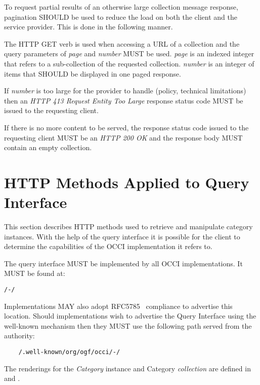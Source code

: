 \documentclass[10pt,a4paper]{article}
\begin{document}
To request partial results of an otherwise large collection message response, pagination SHOULD be used to reduce the load on
both the client and the service provider. This is done in the following manner.

The HTTP GET verb is used when accessing a URL of a collection and the query parameters of {\em page} and {\em number} MUST be used. {\em page} is an indexed
integer that refers to a sub-collection of the requested collection. {\em number} is an integer of items that SHOULD be displayed in one paged response.


If {\em number} is too large for the provider to handle (policy, technical limitations) then an \emph{HTTP 413 Request Entity Too Large} response status code MUST be issued to the requesting client.

If there is no more content to be served, the response status code issued to the requesting client MUST be an \emph{HTTP 200 OK} and the response body MUST contain an empty collection.

\section{HTTP Methods Applied to Query Interface}
\label{sec:http_methods_qi}

This section describes HTTP methods used to retrieve and manipulate category instances.  With the help of the query interface it is possible for the client to determine the capabilities of the OCCI implementation it refers to.

The query interface MUST be implemented by all OCCI implementations. It MUST be found at:

\begin{verbatim}
/-/
\end{verbatim}

Implementations MAY also adopt RFC5785~\cite{rfc5785} compliance to advertise this location. Should implementations wish to advertise the Query Interface using the well-known mechanism then they MUST use the following path served from the authority:

\begin{verbatim}
	/.well-known/org/ogf/occi/-/
\end{verbatim}

The renderings for the {\em Category} instance and Category {\em collection} are defined in \cite{occi:text} and \cite{occi:json}.
\end{document}
